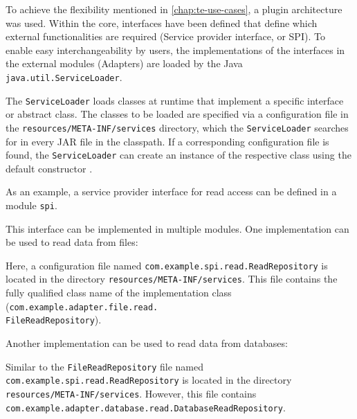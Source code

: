 To achieve the flexibility mentioned in \autoref{chap:te-use-cases}, a plugin architecture was used.
Within the core, interfaces have been defined that define which external functionalities are required (Service provider interface, or SPI).
To enable easy interchangeability by users, the implementations of the interfaces in the external modules (Adapters) are loaded by the Java \texttt{java.util.ServiceLoader}.

The \texttt{ServiceLoader} loads classes at runtime that implement a specific interface or abstract class.
The classes to be loaded are specified via a configuration file in the \texttt{resources/META-INF/services} directory, which the \texttt{ServiceLoader} searches for in every JAR file in the classpath.
If a corresponding configuration file is found, the \texttt{ServiceLoader} can create an instance of the respective class using the default constructor \cite{java-service-loader}.

As an example, a service provider interface for read access can be defined in a module \texttt{spi}.



\noindent
This interface can be implemented in multiple modules.
One implementation can be used to read data from files:



\noindent
Here, a configuration file named \texttt{com.example.spi.read.ReadRepository} is located in the directory \texttt{resources/META-INF/services}.
This file contains the fully qualified class name of the implementation class (\texttt{com.example.adapter.file.read.}\\\texttt{FileReadRepository}).

\newpage
Another implementation can be used to read data from databases:



\noindent
Similar to the \texttt{FileReadRepository} file named \texttt{com.example.spi.read.ReadRepository} is located in the directory \texttt{resources/META-INF/services}.
However, this file contains \texttt{com.example.adapter.database.read.DatabaseReadRepository}.

